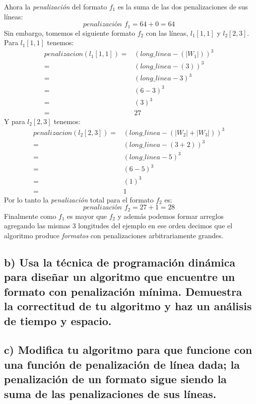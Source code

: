 \documentclass[12pt]{article}
\begin{document}
	Ahora la \textit{penalización} del formato $f_1$ es la suma de las dos penalizaciones de sus líneas:
	\begin{equation}
		\textit{penalización $f_1$}= 64 + 0 = 64 
	\end{equation}
	Sin embargo, tomemos el siguiente formato $f_2$ con las líneas, $l_1[1,1]$ y $l_2[2,3]$. Para $l_1[1,1]$ tenemos:
	\begin{equation}
	\begin{split}
	\textit{penalizacion}(l_1[1,1])= & (long\_linea - (|W_1|))^3 \\
	= & (long\_linea - (3))^3 \\
	= & (long\_linea - 3)^3\\
	= & (6 - 3)^3\\
	= & (3)^3 \\
	= & 27
	\end{split}
	\end{equation}
	Y para $l_2[2,3]$ tenemos:
	\begin{equation}
	\begin{split}
	\textit{penalizacion}(l_2[2,3])= & (long\_linea - (|W_2|+|W_3|))^3 \\
	= & (long\_linea - (3 + 2))^3 \\
	= & (long\_linea - 5)^3\\
	= & (6 - 5)^3\\
	= & (1)^3 \\
	= & 1
	\end{split}
	\end{equation}
	Por lo tanto la \textit{penalización} total para el formato $f_2$ es:
	\begin{equation}
	\textit{penalización $f_2$}= 27 + 1 = 28 
	\end{equation}
	Finalmente como $f_1$ es mayor que $f_2$ y además podemos formar arreglos agregando las mismas 3 longitudes del ejemplo en ese orden decimos que el algoritmo produce \textit{formatos} con penalizaciones arbitrariamente grandes.
	\subsection{b) Usa la técnica de programación dinámica para diseñar un algoritmo que encuentre un formato con penalización mínima. Demuestra la correctitud de tu algoritmo y haz un análisis de tiempo y espacio.}
	\subsection{c) Modifica tu algoritmo para que funcione con una función de penalización de línea dada; la penalización de un formato sigue siendo la suma de las penalizaciones de sus líneas.}
\end{document}
